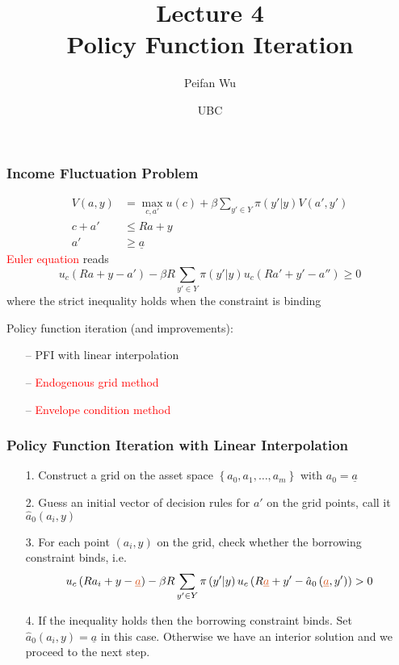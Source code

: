 \documentclass[aspectratio=169, 11pt]{beamer}
\begin{document}
\title{Lecture 4 \\ Policy Function Iteration}
\author[Wu]{Peifan Wu}
\date{UBC}

\begin{frame}
\titlepage
\end{frame}

\begin{frame}
\frametitle{Income Fluctuation Problem}
  \begin{align*}
    V\left(a,y\right) & =\max_{c,a'} u\left(c\right)+\beta\sum_{y'\in Y}\pi\left(y'|y\right)V\left(a',y'\right)\\
    c+a' & \leqslant Ra+y\\
    a' & \geqslant\underline{a}
  \end{align*}
  \bigskip
  \textcolor{red}{Euler equation} reads
  \[
    u_{c}\left(Ra+y-a'\right)-\beta R\sum_{y'\in Y}\pi\left(y'|y\right)u_{c}\left(Ra'+y'-a''\right)\geqslant0
  \]
  where the strict inequality holds when the constraint is binding
  \bigskip

  Policy function iteration (and improvements):
  \begin{itemize}
    \item[--] PFI with linear interpolation
    \item[--] \textcolor{red}{Endogenous grid method}
    \item[--] \textcolor{red}{Envelope condition method}
  \end{itemize}
\end{frame}

\begin{frame}
\frametitle{Policy Function Iteration with Linear Interpolation}
  \begin{itemize}
    \item[1.] Construct a grid on the asset space $\left\{ a_{0},a_{1},\ldots,a_{m}\right\}$ with $a_{0}=\underline{a}$
    \item[2.] Guess an initial vector of decision rules for $a'$ on the grid points, call it $\hat{a}_{0}\left(a_{i},y\right)$
    \item[3.] For each point $\left(a_{i},y\right)$ on the grid, check whether the borrowing constraint binds, i.e.
    \[
      u_{c}\left(Ra_{i}+y-\textcolor{red}{\underline{a}}\right)-\beta R\sum_{y'\in Y}\pi\left(y'|y\right)u_{c}\left(R\textcolor{red}{\underline{a}}+y'-\hat{a}_{0}\left(\textcolor{red}{\underline{a}},y'\right)\right)>0
    \]
    \item[4.] If the inequality holds then the borrowing constraint binds. Set $\hat{a}_{0}\left(a_{i},y\right)=\underline{a}$ in this case. Otherwise we have an interior solution and we proceed to the next step.
  \end{itemize}
\end{frame}
\end{document}
